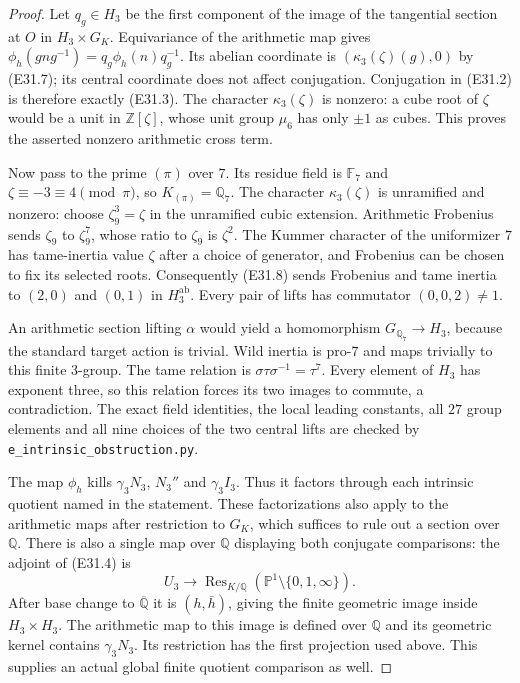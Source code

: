 \begin{proof}
Let $q_g\in H_3$ be the first component of the image of the
tangential section at $O$ in
$H_3\times G_K$. Equivariance of the arithmetic map gives
$\phi_h(gng^{-1})=q_g\phi_h(n)q_g^{-1}$.
Its abelian coordinate is
$(\kappa_3(\zeta)(g),0)$ by (E31.7); its central coordinate
does not affect conjugation. Conjugation in (E31.2) is therefore
exactly (E31.3).
The character $\kappa_3(\zeta)$ is nonzero: a cube root of
$\zeta$ would be a unit in $\mathbb Z[\zeta]$, whose unit group
$\mu_6$ has only $\pm1$ as cubes.
This proves the asserted nonzero arithmetic cross term.

Now pass to the prime $(\pi)$ over $7$.
Its residue field is $\mathbb F_7$ and
$\zeta\equiv-3\equiv4\pmod\pi$, so
$K_{(\pi)}=\mathbb Q_7$.
The character $\kappa_3(\zeta)$ is unramified and nonzero:
choose $\zeta_9^3=\zeta$ in the unramified cubic extension.
Arithmetic Frobenius sends $\zeta_9$ to $\zeta_9^7$, whose
ratio to $\zeta_9$ is $\zeta^2$.
The Kummer character of the uniformizer $7$ has tame-inertia
value $\zeta$ after a choice of generator, and Frobenius can
be chosen to fix its selected roots.
Consequently (E31.8) sends Frobenius and tame inertia to
$(2,0)$ and $(0,1)$ in $H_3^{\mathrm{ab}}$.
Every pair of lifts has commutator $(0,0,2)\ne1$.

An arithmetic section lifting $\alpha$ would yield a
homomorphism $G_{\mathbb Q_7}\to H_3$, because the standard
target action is trivial. Wild inertia is pro-$7$ and maps
trivially to this finite $3$-group. The tame relation is
$\sigma\tau\sigma^{-1}=\tau^7$.
Every element of $H_3$ has exponent three, so this relation
forces its two images to commute, a contradiction.
The exact field identities, the local leading constants,
all $27$ group elements and all nine choices of the two
central lifts are checked by
\texttt{e\_intrinsic\_obstruction.py}.

The map $\phi_h$ kills $\gamma_3N_3$, $N_3''$ and
$\gamma_3I_3$. Thus it factors through each intrinsic quotient
named in the statement. These factorizations also apply to
the arithmetic maps after restriction to $G_K$, which suffices
to rule out a section over $\mathbb Q$.
There is also a single map over $\mathbb Q$ displaying both
conjugate comparisons: the adjoint of (E31.4) is
\[
 U_3\longrightarrow
 \operatorname{Res}_{K/\mathbb Q}
      (\mathbb P^1\setminus\{0,1,\infty\}).
 \tag{E31.9}
\]
After base change to $\overline{\mathbb Q}$ it is
$(h,\bar h)$, giving the finite geometric image inside
$H_3\times H_3$. The arithmetic map to this image is defined
over $\mathbb Q$ and its geometric kernel contains
$\gamma_3N_3$. Its restriction has the first projection
used above. This supplies an actual global finite quotient
comparison as well.


\end{proof}
